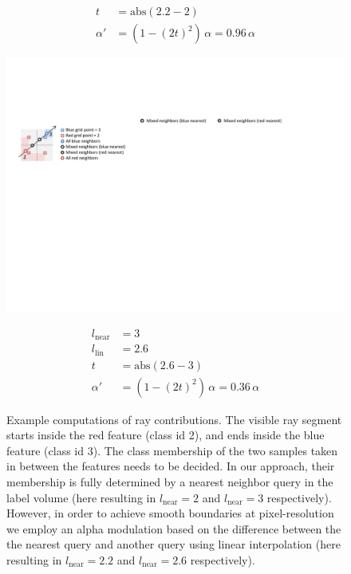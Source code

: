 \documentclass{egpubl}
\begin{document}
\begin{figure}
\begin{minipage}{0.27\linewidth}
\begin{minipage}{1.0\linewidth}
\begin{align}
t &= \mathrm{abs}(2.2-2)\nonumber\\
\alpha' &= (1-(2t)^2) \,\alpha = 0.96 \,\alpha \nonumber
\end{align}
\end{minipage}
\end{minipage}\hfill
\begin{minipage}{0.27\linewidth}
\begin{minipage}{1.0\linewidth}
\includegraphics[width=1.0\linewidth]{figures/Neighborhood_blue}
\end{minipage}
\begin{minipage}{1.0\linewidth}
\begin{align}
l_\mathrm{near} &= 3\nonumber\\
l_\mathrm{lin} &= 2.6\nonumber\\
t &= \mathrm{abs}(2.6-3)\nonumber\\
\alpha' &= (1-(2t)^2) \,\alpha = 0.36 \,\alpha \nonumber
\end{align}
\end{minipage}
\end{minipage}
\caption{\label{fig:example-illustration}
Example computations of ray contributions. The visible ray segment starts inside the red feature (class id 2), and ends inside the blue feature (class id 3). The class membership of the two samples taken in between the features needs to be decided. In our approach, their membership is fully determined by a nearest neighbor query in the label volume (here resulting in $l_\mathrm{near}=2$ and $l_\mathrm{near}=3$ respectively). However, in order to achieve smooth boundaries at pixel-resolution we employ an alpha modulation based on the difference between the the nearest query and another query using linear interpolation (here resulting in $l_\mathrm{near}=2.2$ and $l_\mathrm{near}=2.6$ respectively). 
}
\end{figure}
\end{document}
